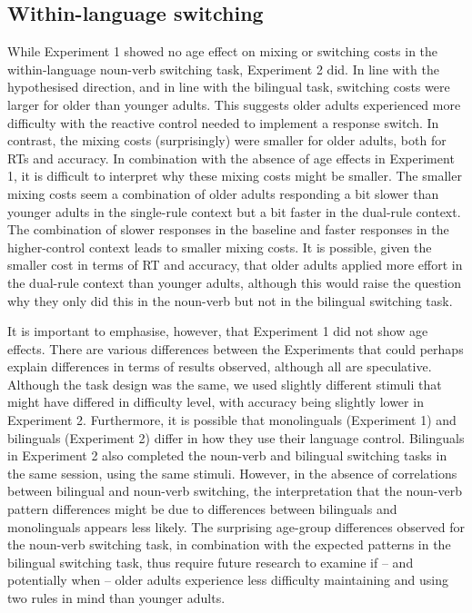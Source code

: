 \documentclass[
]{article}
\begin{document}
\hypertarget{within-language-switching}{%
\subsection{Within-language switching}\label{within-language-switching}}

While Experiment 1 showed no age effect on mixing or switching costs in the within-language noun-verb switching task, Experiment 2 did. In line with the hypothesised direction, and in line with the bilingual task, switching costs were larger for older than younger adults. This suggests older adults experienced more difficulty with the reactive control needed to implement a response switch. In contrast, the mixing costs (surprisingly) were smaller for older adults, both for RTs and accuracy. In combination with the absence of age effects in Experiment 1, it is difficult to interpret why these mixing costs might be smaller. The smaller mixing costs seem a combination of older adults responding a bit slower than younger adults in the single-rule context but a bit faster in the dual-rule context. The combination of slower responses in the baseline and faster responses in the higher-control context leads to smaller mixing costs. It is possible, given the smaller cost in terms of RT and accuracy, that older adults applied more effort in the dual-rule context than younger adults, although this would raise the question why they only did this in the noun-verb but not in the bilingual switching task.

It is important to emphasise, however, that Experiment 1 did not show age effects. There are various differences between the Experiments that could perhaps explain differences in terms of results observed, although all are speculative. Although the task design was the same, we used slightly different stimuli that might have differed in difficulty level, with accuracy being slightly lower in Experiment 2. Furthermore, it is possible that monolinguals (Experiment 1) and bilinguals (Experiment 2) differ in how they use their language control. Bilinguals in Experiment 2 also completed the noun-verb and bilingual switching tasks in the same session, using the same stimuli. However, in the absence of correlations between bilingual and noun-verb switching, the interpretation that the noun-verb pattern differences might be due to differences between bilinguals and monolinguals appears less likely. The surprising age-group differences observed for the noun-verb switching task, in combination with the expected patterns in the bilingual switching task, thus require future research to examine if -- and potentially when -- older adults experience less difficulty maintaining and using two rules in mind than younger adults.
\end{document}
